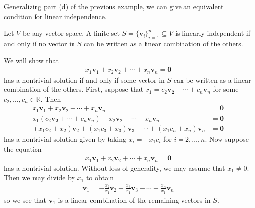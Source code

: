 \documentclass[12pt,letterpaper,reqno]{article}
\numberwithin{equation}{section}
\newcommand{\R}{\ensuremath{\mathbb R}}
\begin{document}
Generalizing part (d) of the previous example, we can give an equivalent condition for linear independence.

\begin{thm}
	Let $V$ be any vector space. A finite set $S=\{\mathbf{v}_i\}_{i=1}^n \subseteq V$ is linearly independent if and only if no vector in $S$ can be written as a linear combination of the others.
\end{thm}

\begin{pf}
We will show that 
\begin{align*}
	x_1\mathbf{v}_1+x_2\mathbf{v}_2+\cdots+x_n\mathbf{v}_n=\mathbf{0}
\end{align*}
has a nontrivial solution if and only if some vector in $S$ can be written as a linear combination of the others. First, suppose that $x_1=c_2\mathbf{v_2}+\cdots+c_n\mathbf{v}_n$ for some $c_2,\dots,c_n \in \R$. Then 
\begin{align*}
	x_1\mathbf{v}_1+x_2\mathbf{v}_2+\cdots+x_n\mathbf{v}_n&=\mathbf{0} \\
	x_1(c_2\mathbf{v_2}+\cdots+c_n\mathbf{v}_n)+x_2\mathbf{v}_2+\cdots+x_n\mathbf{v}_n&=\mathbf{0} \\
	(x_1c_2+x_2)\mathbf{v}_2+(x_1c_3+x_3)\mathbf{v}_3+\cdots+(x_1c_n+x_n)\mathbf{v}_n&=\mathbf{0}
\end{align*}
has a nontrivial solution given by taking $x_i=-x_1c_i$ for $i=2,\dots,n$. Now suppose the equation
\begin{align*}
	x_1\mathbf{v}_1+x_2\mathbf{v}_2+\cdots+x_n\mathbf{v}_n=\mathbf{0}
\end{align*}	
has a nontrivial solution. Without loss of generality, we may assume that $x_1 \neq 0$.  Then we may divide by $x_1$ to obtain
\begin{align*}
	\mathbf{v}_1=-\frac{x_2}{x_1}\mathbf{v}_2-\frac{x_3}{x_1}\mathbf{v}_3-\cdots-\frac{x_n}{x_1}\mathbf{v}_n
\end{align*}
so we see that $\mathbf{v}_1$ is a linear combination of the remaining vectors in $S$. 
\end{pf}
\end{document}
